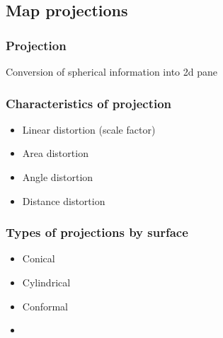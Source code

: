 \documentclass[17pt]{beamer}
\begin{document}
\subsection{Map projections}

\begin{frame}
  \frametitle{Projection}
  Conversion of spherical information into 2d pane
\end{frame}

\begin{frame}
  \frametitle{Characteristics of projection}
  \begin{itemize}
  \item Linear distortion (scale factor)
  \item Area distortion
  \item Angle distortion
  \item Distance distortion
  \end{itemize}
\end{frame}

\begin{frame}
  \frametitle{Types of projections by surface}
  \begin{itemize}
  \item Conical
  \item Cylindrical
  \item Conformal
  \item
  \end{itemize}
\end{frame}
\end{document}
